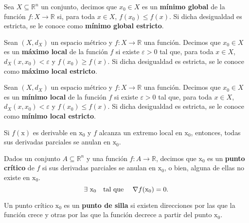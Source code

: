 \documentclass[8pt,a4paper]{extarticle}
\begin{document}
\begin{multicols}{3}
	\begin{boxdef}
		Sea $X \subseteq \mathbb{R}^{n}$ un conjunto, decimos que $x_0 \in X$ es un \textbf{mínimo global} de la función $f : X \to \mathbb{R}$ si, para toda $x \in X$, $f(x_0) \leq f(x)$. Si dicha desigualdad es estricta, se le conoce como \textbf{mínimo global estricto}.
	\end{boxdef}

	\begin{boxdef}
		Sean $(X, d_X)$ un espacio métrico y $f : X \to \mathbb{R}$ una función. Decimos que $x_0 \in X$ es un \textbf{máximo local} de la función $f$ si existe $\varepsilon > 0$ tal que, para toda $x \in X$, $d_X (x, x_0) < \varepsilon$ y $f(x_0) \geq f(x)$. Si dicha desigualdad es estricta, se le conoce como \textbf{máximo local estricto}.
	\end{boxdef}

	\begin{boxdef}
		Sean $(X, d_X)$ un espacio métrico y $f : X \to \mathbb{R}$ una función. Decimos que $x_0 \in X$ es un \textbf{mínimo local} de la función $f$ si existe $\varepsilon > 0$ tal que, para toda $x \in X$, $d_X (x, x_0) < \varepsilon$ y $f(x_0) \leq f(x)$. Si dicha desigualdad es estricta, se le conoce como \textbf{mínimo local estricto}.
	\end{boxdef}

	\begin{boxtheo}
		Si $f(\mathrm{x})$ es derivable en $\mathrm{x}_0$ y $f$ alcanza un extremo local en $\mathrm{x}_0$, entonces, todas sus derivadas parciales se anulan en $\mathrm{x}_0$.
	\end{boxtheo}

	\begin{boxdef}
		Dados un conjunto $A \subseteq \mathbb{R}^n$ y una función $f : A \to \mathbb{R}$, decimos que $\mathrm{x}_0$ es un \textbf{punto crítico} de $f$ si sus derivadas parciales se anulan en $\mathrm{x}_0$, o bien, alguna de ellas no existe en $\mathrm{x}_0$.
		\[\exists\ \mathrm{x}_0 \quad \text{\normalfont tal que} \quad\ \nabla f(\mathrm{x}_0) = 0.\]
	\end{boxdef}

	\begin{boxdef}
		Un punto crítico $\mathrm{x}_0$ es un \textbf{punto de silla} si existen direcciones por las que la función crece y otras por las que la función decrece a partir del punto $\mathrm{x}_0$.
	\end{boxdef}


\end{multicols}
\end{document}
